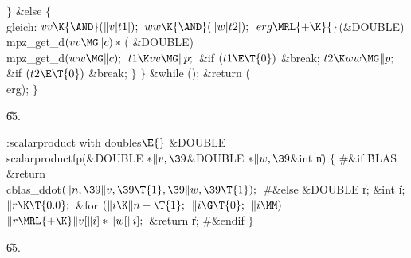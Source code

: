\4${}\}{}$\2\6
\&{else}\5
${}\{{}$\1\6
\4\\{gleich}:\5
${}\\{vv}\K{\AND}(\|v[\\{t1}]);{}$\6
${}\\{ww}\K{\AND}(\|w[\\{t2}]);{}$\6
${}\\{erg}\MRL{+{\K}}{}$(\&{DOUBLE}) \\{mpz\_get\_d}${}(\\{vv}\MG\|c)*{}$(%
\&{DOUBLE}) \\{mpz\_get\_d}${}(\\{ww}\MG\|c);{}$\6
${}\\{t1}\K\\{vv}\MG\|p;{}$\6
\&{if} ${}(\\{t1}\E\T{0}){}$\1\5
\&{break};\2\6
${}\\{t2}\K\\{ww}\MG\|p;{}$\6
\&{if} ${}(\\{t2}\E\T{0}){}$\1\5
\&{break};\2\6
\4${}\}{}$\2\6
\4${}\}{}$\2\5
\&{while} ();\6
\&{return} (\\{erg});\6
\4${}\}{}$\2\par
\U65.\fi

\B{}:scalarproduct with doubles\X${}\E{}$\6
\&{DOUBLE} \\{scalarproductfp}(\&{DOUBLE} ${}{*}\|v,\39{}$\&{DOUBLE} ${}{*}\|w,%
\39{}$\&{int} \|n)\1\1\2\2\6
${}\{{}$\6
\8\#\&{if} \.{BLAS}\1\6
\&{return} \\{cblas\_ddot}${}(\|n,\39\|v,\39\T{1},\39\|w,\39\T{1});{}$\6
\8\#\&{else}\7
\&{DOUBLE} \|r;\6
\&{int} \|i;\7
${}\|r\K\T{0.0};{}$\6
\&{for} ${}(\|i\K\|n-\T{1};{}$ ${}\|i\G\T{0};{}$ ${}\|i\MM){}$\1\5
${}\|r\MRL{+{\K}}\|v[\|i]*\|w[\|i];{}$\2\6
\&{return} \|r;\6
\8\#\&{endif}\6
\4${}\}{}$\2\par
\U65.\fi

